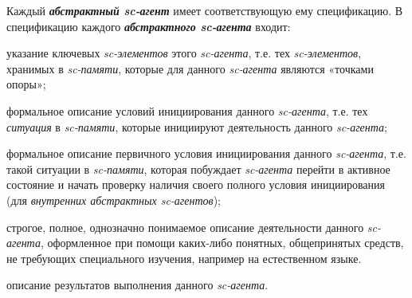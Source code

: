 \begin{SCn}
{Каждый \textbf{\textit{абстрактный sc-агент}} имеет соответствующую ему спецификацию. В спецификацию каждого \textbf{\textit{абстрактного sc-агента}} входит:
\begin{scnitemize}
    \item указание ключевых \textit{sc-элементов} этого \textit{sc-агента}, т.е. тех \textit{sc-элементов}, хранимых в \textit{sc-памяти}, которые для данного \textit{sc-агента} являются «точками опоры»;
    \item формальное описание условий инициирования данного \textit{sc-агента}, т.е. тех \textit{ситуация} в \textit{sc-памяти}, которые инициируют деятельность данного \textit{sc-агента};
    \item формальное описание первичного условия инициирования данного \textit{sc-агента}, т.е. такой ситуации в \textit{sc-памяти}, которая побуждает \textit{sc-агента} перейти в активное состояние и начать проверку наличия своего полного условия инициирования (для \textit{внутренних абстрактных sc-агентов});
    \item строгое, полное, однозначно понимаемое описание деятельности данного \textit{sc-агента}, оформленное при помощи каких-либо понятных, общепринятых средств, не требующих специального изучения, например на естественном языке.
    \item описание результатов выполнения данного \textit{sc-агента}.
\end{scnitemize}
}




\end{SCn}
